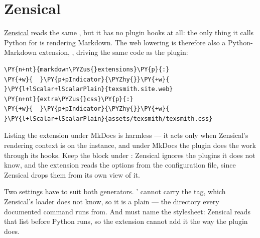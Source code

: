 \documentclass[a4paper,twoside]{article}
\begin{document}
\section{Zensical}
\href{https://zensical.org}{Zensical} reads the same , but it has no
plugin hooks at all: the only thing it calls Python for is rendering Markdown.
The web lowering is therefore also a Python-Markdown extension,
, driving the same code as the plugin:
\begin{tscode}[lang=yaml, engine=pygments]
\begin{Verbatim}[commandchars=\\\{\},breaklines, breakanywhere, commandchars=\\\{\}]
\PY{n+nt}{markdown\PYZus{}extensions}\PY{p}{:}
\PY{+w}{  }\PY{p+pIndicator}{\PYZhy{}}\PY{+w}{ }\PY{l+lScalar+lScalarPlain}{texsmith.site.web}
\PY{n+nt}{extra\PYZus{}css}\PY{p}{:}
\PY{+w}{  }\PY{p+pIndicator}{\PYZhy{}}\PY{+w}{ }\PY{l+lScalar+lScalarPlain}{assets/texsmith/texsmith.css}
\end{Verbatim}
\end{tscode}
Listing the extension under MkDocs is harmless --- it acts only when Zensical's
rendering context is on the  instance, and under MkDocs the plugin
does the work through its hooks. Keep the  block under :
Zensical ignores the plugins it does not know, and the extension reads the
options from the configuration file, since Zensical drops them from its own
view of it.

Two settings have to suit both generators. ' 
cannot carry the  tag, which Zensical's loader does not know, so it
is a plain  --- the directory every documented command runs from.
And  must name the stylesheet: Zensical reads that list before
Python runs, so the extension cannot add it the way the plugin does.
\end{document}
